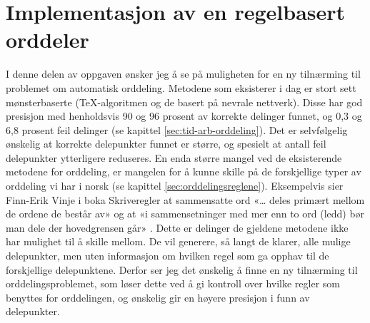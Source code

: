 \chapter{Implementasjon av en regelbasert orddeler}

I denne delen av oppgaven ønsker jeg å se på muligheten for en ny tilnærming til problemet om automatisk orddeling. Metodene som eksisterer i dag er stort sett mønsterbaserte (\TeX{}-algoritmen og de basert på nevrale nettverk). Disse har god presisjon med henholdsvis 90 og 96 prosent av korrekte delinger funnet, og 0,3 og 6,8 prosent feil delinger (se kapittel \ref{sec:tid-arb-orddeling}). Det er selvfølgelig ønskelig at korrekte delepunkter funnet er større, og spesielt at antall feil delepunkter ytterligere reduseres. En enda større mangel ved de eksisterende metodene for orddeling, er mangelen for å kunne skille på de forskjellige typer av orddeling vi har i norsk (se kapittel \ref{sec:orddelingsreglene}). Eksempelvis sier Finn-Erik Vinje i boka Skriveregler at sammensatte ord «… deles primært mellom de ordene de består av» og at «i sammensetninger med mer enn to ord (ledd) bør man dele der hovedgrensen går» \cite{vinje}. Dette er delinger de gjeldene metodene ikke har mulighet til å skille mellom. De vil generere, så langt de klarer, alle mulige delepunkter, men uten informasjon om hvilken regel som ga opphav til de forskjellige delepunktene. Derfor ser jeg det ønskelig å finne en ny tilnærming til orddelingsproblemet, som løser dette ved å gi kontroll over hvilke regler som benyttes for orddelingen, og ønskelig gir en høyere presisjon i funn av delepunkter.

